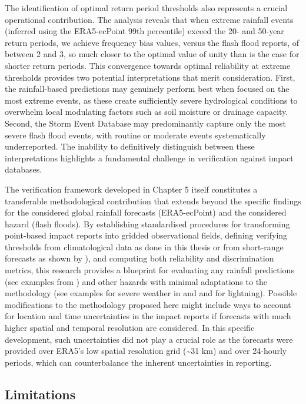 The identification of optimal return period thresholds also represents a crucial operational contribution. The analysis reveals that when extreme rainfall events (inferred using the ERA5-ecPoint 99th percentile) exceed the 20- and 50-year return periods, we achieve frequency bias values, versus the flash flood reports, of between 2 and 3, so much closer to the optimal value of unity than is the case for shorter return periods. This convergence towards optimal reliability at extreme thresholds provides two potential interpretations that merit consideration. First, the rainfall-based predictions may genuinely perform best when focused on the most extreme events, as these create sufficiently severe hydrological conditions to overwhelm local modulating factors such as soil moisture or drainage capacity. Second, the Storm Event Database may predominantly capture only the most severe flash flood events, with routine or moderate events systematically underreported. The inability to definitively distinguish between these interpretations highlights a fundamental challenge in verification against impact databases. 

The verification framework developed in Chapter 5 itself constitutes a transferable methodological contribution that extends beyond the specific findings for the considered global rainfall forecasts (ERA5-ecPoint) and the considered hazard (flash floods). By establishing standardised procedures for transforming point-based impact reports into gridded observational fields, defining verifying thresholds from climatological data as done in this thesis or from short-range forecasts as shown by \citet{Pillosu_2024}), and computing both reliability and discrimination metrics, this research provides a blueprint for evaluating any 
rainfall predictions (see examples from \citep{Pillosu_2024}) and other hazards with minimal adaptations to the methodology (see examples for severe weather in \citet{Robbins_2018} and \citet{Tsonevsky_2018} and \citet{Cavaiola_2024} for lightning). Possible modifications to the methodology proposed here might include ways to account for location and time uncertainties in the impact reports if forecasts with much higher spatial and temporal resolution are considered. In this specific development, such uncertainties did not play a crucial role as the forecasts were provided over ERA5's low spatial resolution grid (\sim31 km) and over 24-hourly periods, which can counterbalance the inherent uncertainties in reporting.

\subsection{Limitations}

